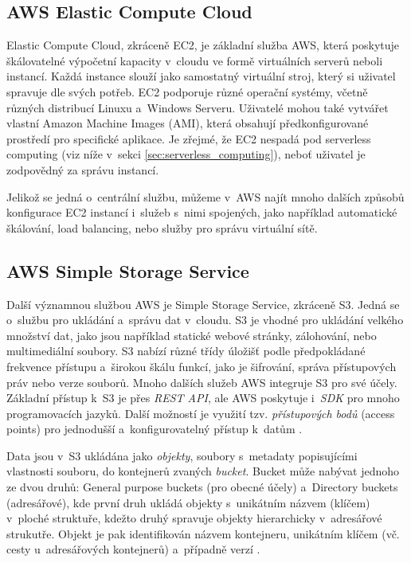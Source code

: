 \documentclass[czech, ing, kiv, he, iso690]{fasthesis}
\begin{document}
\subsection{AWS Elastic Compute Cloud}
Elastic Compute Cloud, zkráceně EC2, je základní služba AWS, která poskytuje škálovatelné výpočetní kapacity v~cloudu ve formě virtuálních serverů neboli instancí. Každá instance slouží jako samostatný virtuální stroj, který si uživatel spravuje dle svých potřeb. EC2 podporuje různé operační systémy, včetně různých distribucí Linuxu a~Windows Serveru. Uživatelé mohou také vytvářet vlastní Amazon Machine Images (AMI), která obsahují předkonfigurované prostředí pro specifické aplikace. Je zřejmé, že EC2 nespadá pod serverless computing (viz níže v~sekci \ref{sec:serverless_computing}), neboť uživatel je zodpovědný za správu instancí.

Jelikož se jedná o~centrální službu, můžeme v~AWS najít mnoho dalších způsobů konfigurace EC2 instancí i~služeb s~nimi spojených, jako například automatické škálování, load balancing, nebo služby pro správu virtuální sítě.


\subsection{AWS Simple Storage Service}
Další významnou službou AWS je Simple Storage Service, zkráceně S3. Jedná se o~službu pro ukládání a~správu dat v~cloudu. S3 je vhodné pro ukládání velkého množství dat, jako jsou například statické webové stránky, zálohování, nebo multimediální soubory. S3 nabízí různé třídy úložišť podle předpokládané frekvence přístupu a~širokou škálu funkcí, jako je šifrování, správa přístupových práv nebo verze souborů. Mnoho dalších služeb AWS integruje S3 pro své účely. Základní přístup k~S3 je přes \emph{REST API}, ale AWS poskytuje i~\emph{SDK} pro mnoho programovacích jazyků. Další možností je využití tzv. \emph{přístupových bodů} (access points) pro jednodušší a~konfigurovatelný přístup k~datům \cite{s3.docs.aws}.

Data jsou v~S3 ukládána jako \emph{objekty}, soubory s~metadaty popisujícími vlastnosti souboru, do kontejnerů zvaných \emph{bucket}. Bucket může nabývat jednoho ze dvou druhů: General purpose buckets (pro obecné účely) a~Directory buckets (adresářové), kde první druh ukládá objekty s~unikátním názvem (klíčem) v~ploché struktuře, kdežto druhý spravuje objekty hierarchicky v~adresářové strukutře. Objekt je pak identifikován názvem kontejneru, unikátním klíčem (vč. cesty u~adresářových kontejnerů) a~případně verzí \cite{s3.docs.aws}.
\end{document}

